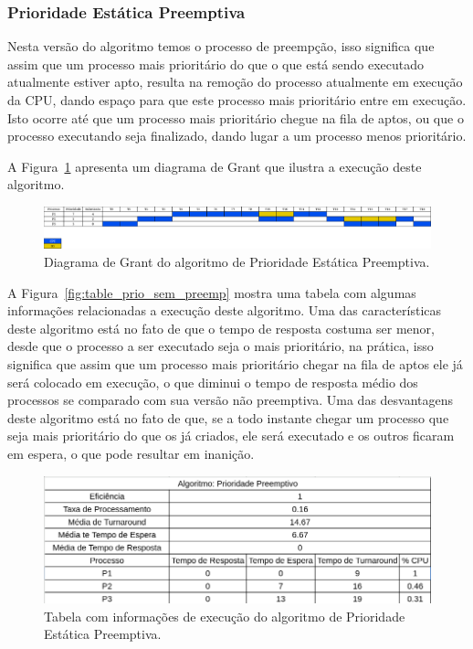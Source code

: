 \documentclass[
	12pt,				%
	oneside,   	        %
	a4paper,			%
	english,			%
	french,				%
	spanish,			%
	brazil,				%
	]{pacotes/abntex2}
\begin{document}
\subsubsection{Prioridade Estática Preemptiva}
\label{subsubsec:prio_preemp}

Nesta versão do algoritmo temos o processo de preempção, isso significa que assim que um processo mais prioritário do que o que está sendo executado atualmente estiver apto, resulta na remoção do processo atualmente em execução da CPU, dando espaço para que este processo mais prioritário entre em execução. Isto ocorre até que um processo mais prioritário chegue na fila de aptos, ou que o processo executando seja finalizado, dando lugar a um processo menos prioritário.

 A Figura~\ref{fig:prio_preemp} apresenta um diagrama de Grant que ilustra a execução deste algoritmo.

\begin{figure}[H]
  \centering
  \includegraphics[scale=0.20]{figuras/ex2/prio_preemp.png}
  \caption{Diagrama de Grant do algoritmo de Prioridade Estática Preemptiva.}
  \label{fig:prio_preemp}
\end{figure}

A Figura~\ref{fig:table_prio_sem_preemp} mostra uma tabela com algumas informações relacionadas a execução deste algoritmo. Uma das características deste algoritmo está no fato de que o tempo de resposta costuma ser menor, desde que o processo a ser executado seja o mais prioritário, na prática, isso significa que assim que um processo mais prioritário chegar na fila de aptos ele já será colocado em execução, o que diminui o tempo de resposta médio dos processos se comparado com sua versão não preemptiva. Uma das desvantagens deste algoritmo está no fato de que, se a todo instante chegar um processo que seja mais prioritário do que os já criados, ele será executado e os outros ficaram em espera, o que pode resultar em inanição.

\begin{figure}[H]
  \centering
  \includegraphics[scale=0.5]{figuras/ex2/table_prio_preemp.png}
  \caption{Tabela com informações de execução do algoritmo de Prioridade Estática Preemptiva.}
  \label{fig:table_prio_preemp}
\end{figure}
\end{document}
